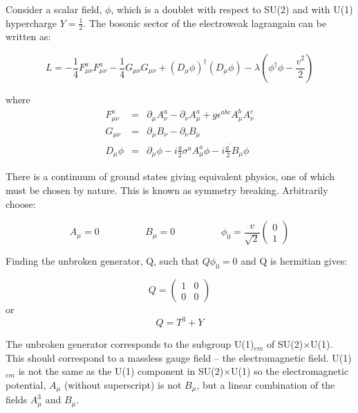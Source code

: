 Consider a scalar field, $\phi$, which is a doublet with respect to SU(2) and 
with U(1) hypercharge $Y = \frac{1}{2}$. The bosonic sector of the electroweak 
lagrangain can be written as:

\begin{equation}
L = -\frac{1}{4}F_{\mu\nu}^{a}F_{\mu\nu}^{a}
-\frac{1}{4}G_{\mu\nu}G_{\mu\nu} + (D_{\mu}\phi)^{\dagger}(D_{\mu}\phi) -
\lambda\left(\phi^{\dagger}\phi - \frac{v^{2}}{2}\right)
\label{eq:ew}
\end{equation}

where
\begin{eqnarray}
F_{\mu\nu}^{a} &=& \partial_{\mu}A_{\nu}^{a} - \partial_{\nu}A_{\mu}^{a} +
g\epsilon^{abc}A_{\mu}^{b}A_{\nu}^{c} \\
G_{\mu\nu} &=& \partial_{\mu}B_{\nu} - \partial_{\nu}B_{\mu} \\
D_{\mu}\phi &=& \partial_{\mu}\phi - i\frac{g}{2}\sigma^{a}A_{\mu}^{a}\phi -
i\frac{g^{\prime}}{2}B_{\mu}\phi
\end{eqnarray}

There is a continuum of ground states giving equivalent physics, one of which
must be chosen by nature. This is known as symmetry breaking. Arbitrarily 
choose:

\begin{equation}
A_{\mu} = 0 \hspace{2cm} B_{\mu} = 0 \hspace{2cm} \phi_{0} =
\frac{v}{\sqrt{2}}\left(\begin{array}{c}0\\1\end{array}\right)
\end{equation}

Finding the unbroken generator, Q, such that $Q\phi_{0} = 0$ and Q is hermitian
gives:

\begin{equation}
Q = \left(\begin{array}{cc}1&0\\0&0\end{array}\right)
\end{equation}
or
\begin{equation}
Q = T^{3} + Y 
\end{equation}

The unbroken generator corresponds to the subgroup U(1)$_{em}$ of
SU(2)$\times$U(1). This should correspond to a massless gauge field -- the
electromagnetic field. U(1)$_{em}$ is not the same as the U(1) component in
SU(2)$\times$U(1) so the electromagnetic potential, $A_{\mu}$ (without
superscript) is not $B_{\mu}$, but a linear combination of the fields
$A_{\mu}^{3}$ and $B_{\mu}$. \\

